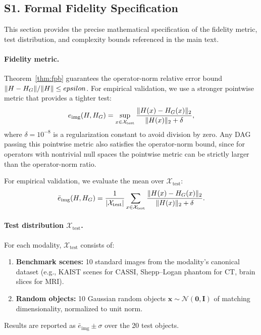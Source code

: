 
\subsection*{S1. Formal Fidelity Specification}
\label{sec:supp_fidelity}

This section provides the precise mathematical specification of the fidelity metric, test distribution, and complexity bounds referenced in the main text.

\paragraph{Fidelity metric.}
Theorem~\ref{thm:fpb} guarantees the operator-norm relative error bound $\|H - H_{G}\|/\|H\| \leq epsilon$. For empirical validation, we use a stronger pointwise metric that provides a tighter test:
\begin{equation}
  e_{\mathrm{img}}(H, H_{G}) = \sup_{x \in \mathcal{X}_{\mathrm{test}}}
  \frac{\|H(x) - H_{G}(x)\|_2}{\|H(x)\|_2 + \delta},
  \label{eq:supp_etier}
\end{equation}
where $\delta = 10^{-8}$ is a regularization constant to avoid division by zero. Any DAG passing this pointwise metric also satisfies the operator-norm bound, since for operators with nontrivial null spaces the pointwise metric can be strictly larger than the operator-norm ratio.

For empirical validation, we evaluate the mean over $\mathcal{X}_{\mathrm{test}}$:
\begin{equation}
  \bar{e}_{\mathrm{img}}(H, H_{G}) = \frac{1}{|\mathcal{X}_{\mathrm{test}}|}
  \sum_{x \in \mathcal{X}_{\mathrm{test}}}
  \frac{\|H(x) - H_{G}(x)\|_2}{\|H(x)\|_2 + \delta}.
  \label{eq:supp_etier_mean}
\end{equation}

\paragraph{Test distribution $\mathcal{X}_{\mathrm{test}}$.}
For each modality, $\mathcal{X}_{\mathrm{test}}$ consists of:
\begin{enumerate}
  \item \textbf{Benchmark scenes:} 10 standard images from the modality's canonical dataset (e.g., KAIST scenes for CASSI, Shepp--Logan phantom for CT, brain slices for MRI).
  \item \textbf{Random objects:} 10 Gaussian random objects $\mathbf{x} \sim \mathcal{N}(\mathbf{0}, \mathbf{I})$ of matching dimensionality, normalized to unit norm.
\end{enumerate}
Results are reported as $\bar{e}_{\mathrm{img}} \pm \sigma$ over the 20 test objects.

